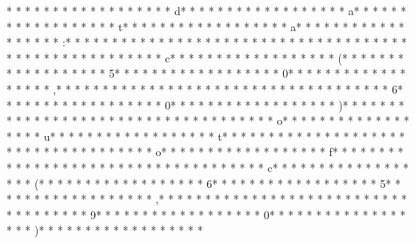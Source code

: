 * * *  * * *  * * *  *  * * *  *  * * *  * d* * *  * * *  * * *  *  * * *  *  * * *  * a* * *  * * *  * * *  *  * * *  *  * * *  * t* * *  * * *  * * *  *  * * *  *  * * *  * a* * *  * * *  * * *  *  * * *  *  * * *  * :* * *  * * *  * * *  *  * * *  *  * * *  *  * * *  * * *  * * *  *  * * *  *  * * *  *  * * *  * * *  * * *  *  * * *  *  * * *  * c* * *  * * *  * * *  *  * * *  *  * * *  * (* * *  * * *  * * *  *  * * *  *  * * *  * 5* * *  * * *  * * *  *  * * *  *  * * *  * 0* * *  * * *  * * *  *  * * *  *  * * *  * ,* * *  * * *  * * *  *  * * *  *  * * *  *  * * *  * * *  * * *  *  * * *  *  * * *  * 6* * *  * * *  * * *  *  * * *  *  * * *  * 0* * *  * * *  * * *  *  * * *  *  * * *  * )* * *  * * *  * * *  *  * * *  *  * * *  *  * * *  * * *  * * *  *  * * *  *  * * *  * o* * *  * * *  * * *  *  * * *  *  * * *  * u* * *  * * *  * * *  *  * * *  *  * * *  * t* * *  * * *  * * *  *  * * *  *  * * *  *  * * *  * * *  * * *  *  * * *  *  * * *  * o* * *  * * *  * * *  *  * * *  *  * * *  * f* * *  * * *  * * *  *  * * *  *  * * *  *  * * *  * * *  * * *  *  * * *  *  * * *  * c* * *  * * *  * * *  *  * * *  *  * * *  * (* * *  * * *  * * *  *  * * *  *  * * *  * 6* * *  * * *  * * *  *  * * *  *  * * *  * 5* * *  * * *  * * *  *  * * *  *  * * *  * ,* * *  * * *  * * *  *  * * *  *  * * *  *  * * *  * * *  * * *  *  * * *  *  * * *  * 9* * *  * * *  * * *  *  * * *  *  * * *  * 0* * *  * * *  * * *  *  * * *  *  * * *  * )* * *  * * *  * * *  *  * * *  *  * * *  * 
